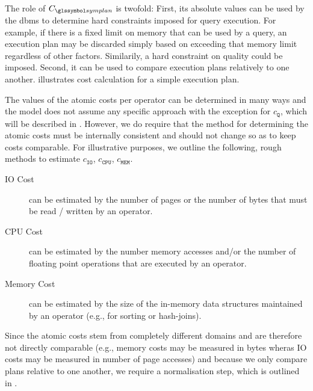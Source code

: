 The role of $C_{\symplan}$ is twofold: First, its absolute values can be used by the \acrshort{dbms} to determine hard constraints imposed for query execution. For example, if there is a fixed limit on memory that can be used by a query, an execution plan may be discarded simply based on exceeding that memory limit regardless of other factors. Similarily, a hard constraint on quality could be imposed. Second, it can be used to compare execution plans relatively to one another.  illustrates cost calculation for a simple execution plan.

The values of the atomic costs per operator can be determined in many ways and the model does not assume any specific approach with the exception for $c_{\mathtt{Q}}$, which will be described in . However, we do require that the method for determining the atomic costs must be internally consistent and should not change so as to keep costs comparable. For illustrative purposes, we outline the following, rough methods to estimate $c_{\mathtt{IO}}$, $c_{\mathtt{CPU}}$, $c_{\mathtt{MEM}}$.

\begin{description}
    \item[IO Cost] can be estimated by the number of pages or the number of bytes that must be read / written by an operator.
    \item[CPU Cost] can be estimated by the number memory accesses and/or the number of floating point operations that are executed by an operator.
    \item[Memory Cost] can be estimated by the size of the in-memory data structures maintained by an operator (e.g., for sorting or hash-joins).
\end{description}

Since the atomic costs stem from completely different domains and are therefore not directly comparable (e.g., memory costs may be measured in bytes wheras IO costs may be measured in number of page accesses) and because we only compare plans relative to one another, we require a normalisation step, which is outlined in .

